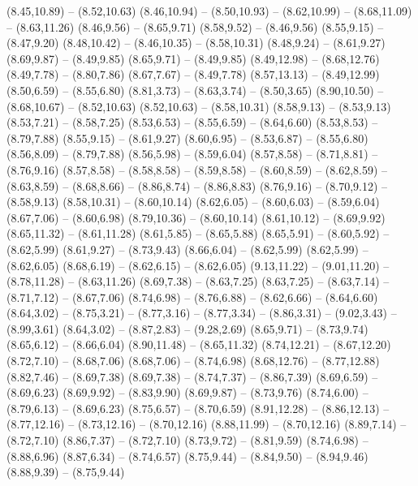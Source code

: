 {  (8.45,10.89) -- (8.52,10.63)
  (8.46,10.94) -- (8.50,10.93) -- (8.62,10.99) -- (8.68,11.09) -- (8.63,11.26)
  (8.46,9.56) -- (8.65,9.71)
  (8.58,9.52) -- (8.46,9.56)
  (8.55,9.15) -- (8.47,9.20)
  (8.48,10.42) -- (8.46,10.35) -- (8.58,10.31)
  (8.48,9.24) -- (8.61,9.27)
  (8.69,9.87) -- (8.49,9.85)
  (8.65,9.71) -- (8.49,9.85)
  (8.49,12.98) -- (8.68,12.76)
  (8.49,7.78) -- (8.80,7.86)
  (8.67,7.67) -- (8.49,7.78)
  (8.57,13.13) -- (8.49,12.99)
  (8.50,6.59) -- (8.55,6.80)
  (8.81,3.73) -- (8.63,3.74) -- (8.50,3.65)
  (8.90,10.50) -- (8.68,10.67) -- (8.52,10.63)
  (8.52,10.63) -- (8.58,10.31)
  (8.58,9.13) -- (8.53,9.13)
  (8.53,7.21) -- (8.58,7.25)
  (8.53,6.53) -- (8.55,6.59) -- (8.64,6.60)
  (8.53,8.53) -- (8.79,7.88)
  (8.55,9.15) -- (8.61,9.27)
  (8.60,6.95) -- (8.53,6.87) -- (8.55,6.80)
  (8.56,8.09) -- (8.79,7.88)
  (8.56,5.98) -- (8.59,6.04)
  (8.57,8.58) -- (8.71,8.81) -- (8.76,9.16)
  (8.57,8.58) -- (8.58,8.58) -- (8.59,8.58) -- (8.60,8.59) -- (8.62,8.59) -- (8.63,8.59) -- (8.68,8.66) -- (8.86,8.74) -- (8.86,8.83)
  (8.76,9.16) -- (8.70,9.12) -- (8.58,9.13)
  (8.58,10.31) -- (8.60,10.14)
  (8.62,6.05) -- (8.60,6.03) -- (8.59,6.04)
  (8.67,7.06) -- (8.60,6.98)
  (8.79,10.36) -- (8.60,10.14)
  (8.61,10.12) -- (8.69,9.92)
  (8.65,11.32) -- (8.61,11.28)
  (8.61,5.85) -- (8.65,5.88)
  (8.65,5.91) -- (8.60,5.92) -- (8.62,5.99)
  (8.61,9.27) -- (8.73,9.43)
  (8.66,6.04) -- (8.62,5.99)
  (8.62,5.99) -- (8.62,6.05)
  (8.68,6.19) -- (8.62,6.15) -- (8.62,6.05)
  (9.13,11.22) -- (9.01,11.20) -- (8.78,11.28) -- (8.63,11.26)
  (8.69,7.38) -- (8.63,7.25)
  (8.63,7.25) -- (8.63,7.14) -- (8.71,7.12) -- (8.67,7.06)
  (8.74,6.98) -- (8.76,6.88) -- (8.62,6.66) -- (8.64,6.60)
  (8.64,3.02) -- (8.75,3.21) -- (8.77,3.16) -- (8.77,3.34) -- (8.86,3.31) -- (9.02,3.43) -- (8.99,3.61)
  (8.64,3.02) -- (8.87,2.83) -- (9.28,2.69)
  (8.65,9.71) -- (8.73,9.74)
  (8.65,6.12) -- (8.66,6.04)
  (8.90,11.48) -- (8.65,11.32)
  (8.74,12.21) -- (8.67,12.20)
  (8.72,7.10) -- (8.68,7.06)
  (8.68,7.06) -- (8.74,6.98)
  (8.68,12.76) -- (8.77,12.88)
  (8.82,7.46) -- (8.69,7.38)
  (8.69,7.38) -- (8.74,7.37) -- (8.86,7.39)
  (8.69,6.59) -- (8.69,6.23)
  (8.69,9.92) -- (8.83,9.90)
  (8.69,9.87) -- (8.73,9.76)
  (8.74,6.00) -- (8.79,6.13) -- (8.69,6.23)
  (8.75,6.57) -- (8.70,6.59)
  (8.91,12.28) -- (8.86,12.13) -- (8.77,12.16) -- (8.73,12.16) -- (8.70,12.16)
  (8.88,11.99) -- (8.70,12.16)
  (8.89,7.14) -- (8.72,7.10)
  (8.86,7.37) -- (8.72,7.10)
  (8.73,9.72) -- (8.81,9.59)
  (8.74,6.98) -- (8.88,6.96)
  (8.87,6.34) -- (8.74,6.57)
  (8.75,9.44) -- (8.84,9.50) -- (8.94,9.46)
  (8.88,9.39) -- (8.75,9.44)
}
